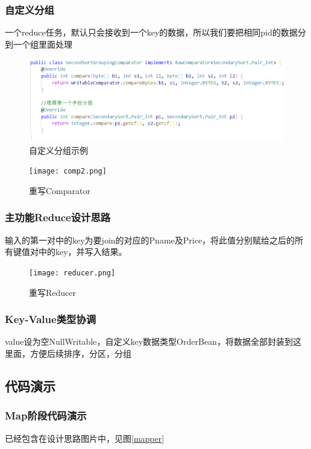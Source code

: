 \documentclass[a4paper,UTF8]{article}
\numberwithin{equation}{section}
\begin{document}
\subsubsection{自定义分组}
一个reduce任务，默认只会接收到一个key的数据，所以我们要把相同pid的数据分到一个组里面处理
\begin{figure}[H]
    \centering

    \includegraphics[width = 15cm]{comp1.png}

    \caption{自定义分组示例}
\end{figure}
\begin{figure}[H]
    \centering

    \texttt{[image: comp2.png]}

    \caption{重写Comparator}
\end{figure}
\subsubsection{主功能Reduce设计思路}
输入的第一对中的key为要join的对应的Pname及Price，将此值分别赋给之后的所有键值对中的key，并写入结果。
\begin{figure}[H]
    \centering

    \texttt{[image: reducer.png]}

    \caption{重写Reducer}
    \label{reducer}
\end{figure}

\subsubsection{Key-Value类型协调}
value设为空NullWritable，自定义key数据类型OrderBean，将数据全部封装到这里面，方便后续排序，分区，分组
\subsection{代码演示}
\subsubsection{Map阶段代码演示}
已经包含在设计思路图片中，见图\ref{mapper}
\end{document}
